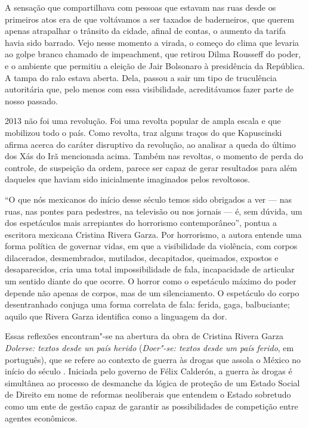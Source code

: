 A sensação que compartilhava com pessoas que estavam nas ruas desde os
primeiros atos era de que voltávamos a ser taxados de baderneiros, que
querem apenas atrapalhar o trânsito da cidade, afinal de contas, o aumento da
tarifa havia sido barrado. Vejo nesse momento a virada, o começo do
clima que levaria ao golpe branco chamado de impeachment, que retirou
Dilma Rousseff do poder, e o ambiente que permitiu a eleição de Jair Bolsonaro à
presidência da República. A tampa do ralo estava aberta. Dela, passou a
sair um tipo de truculência autoritária que, pelo menos com essa
visibilidade, acreditávamos fazer parte de nosso passado.

2013 não foi uma revolução. Foi uma revolta popular de ampla escala e
que mobilizou todo o país. Como revolta, traz alguns traços do que
Kapuscinski afirma acerca do caráter disruptivo da revolução, ao
analisar a queda do último dos Xás do Irã mencionada acima. Também nas
revoltas, o momento de perda do controle, de suspeição da ordem, parece
ser capaz de gerar resultados para além daqueles que haviam sido
inicialmente imaginados pelos revoltosos.

\asterisc

``O que nós mexicanos do início desse século temos sido obrigados a ver
--- nas ruas, nas pontes para pedestres, na televisão ou nos jornais ---
é, sem dúvida, um dos espetáculos mais arrepiantes do horrorismo
contemporâneo'', pontua a escritora mexicana Cristina Rivera Garza. Por
horrorismo, a autora entende uma forma política de governar vidas, em
que a visibilidade da violência, com corpos dilacerados, desmembrados,
mutilados, decapitados, queimados, expostos e desaparecidos, cria uma
total impossibilidade de fala, incapacidade de articular um sentido
diante do que ocorre. O horror como o espetáculo máximo do poder depende
não apenas de corpos, mas de um silenciamento. O espetáculo do corpo
desentranhado conjuga uma forma correlata de fala: ferida, gaga,
balbuciante; aquilo que Rivera Garza identifica como a linguagem da dor.

Essas reflexões encontram"-se na abertura da obra de Cristina Rivera
Garza \emph{Dolerse: textos desde un país herido}
(\emph{Doer"-se: textos desde um país ferido}, em português), que se refere ao
contexto de guerra às drogas que assola o México no início do século
. Iniciada pelo governo de Félix Calderón, a guerra às drogas é
simultânea ao processo de desmanche da lógica de proteção de um Estado
Social de Direito em nome de reformas neoliberais que entendem o Estado
sobretudo como um ente de gestão capaz de garantir as possibilidades de
competição entre agentes econômicos.

